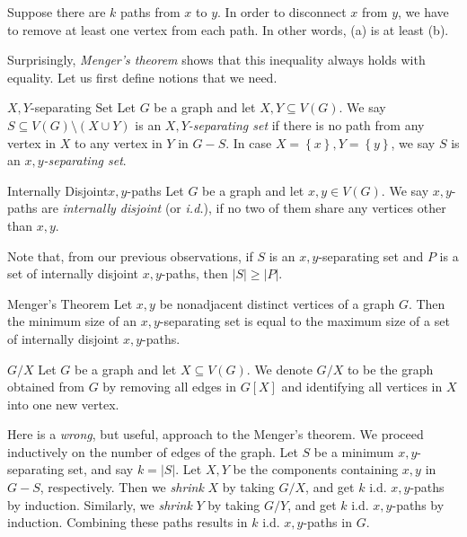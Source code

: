 \documentclass[co342]{subfiles}
\begin{document}
    \begin{subproof}
        Suppose there are $k$ paths from $x$ to $y$. In order to disconnect $x$ from $y$, we have to remove at least one vertex from each path. In other words, (a) is at least (b). 
    \end{subproof}
    
    \noindent Surprisingly, \textit{Menger's theorem} shows that this inequality always holds with equality. Let us first define notions that we need.
    
    \begin{definition}{$X,Y$-separating Set}{}
        Let $G$ be a graph and let $X,Y\subseteq V\left( G \right)$. We say $S\subseteq V\left( G \right)\setminus\left( X\cup Y \right)$ is an \emph{$X,Y$-separating set} if there is no path from any vertex in $X$ to any vertex in $Y$ in $G-S$. In case $X=\left\lbrace x \right\rbrace,Y=\left\lbrace y \right\rbrace$, we say $S$ is an \emph{$x,y$-separating set}.
    \end{definition}

    \begin{definition}{Internally Disjoint}{$x,y$-paths}
        Let $G$ be a graph and let $x,y\in V\left( G \right)$. We say $x,y$-paths are \emph{internally disjoint} (or \emph{i.d.}), if no two of them share any vertices other than $x,y$.
    \end{definition}

    \noindent Note that, from our previous observations, if $S$ is an $x,y$-separating set and $P$ is a set of internally disjoint $x,y$-paths, then $\left| S \right| \geq \left| P \right|$.

    \begin{theorem}{Menger's Theorem}
        Let $x,y$ be nonadjacent distinct vertices of a graph $G$. Then the minimum size of an $x,y$-separating set is equal to the maximum size of a set of internally disjoint $x,y$-paths.
    \end{theorem}

    \begin{notation}{$G /X$}{}
        Let $G$ be a graph and let $X\subseteq V\left( G \right)$. We denote $G /X$ to be the graph obtained from $G$ by removing all edges in $G\left[ X \right]$ and identifying all vertices in $X$ into one new vertex.
    \end{notation}

    Here is a \textit{wrong}, but useful, approach to the Menger's theorem. We proceed inductively on the number of edges of the graph. Let $S$ be a minimum $x,y$-separating set, and say $k=\left| S \right|$. Let $X,Y$ be the components containing $x,y$ in $G-S$, respectively. Then we \textit{shrink} $X$ by taking $G /X$, and get $k$ i.d. $x,y$-paths by induction. Similarly, we \textit{shrink} $Y$ by taking $G /Y$, and get $k$ i.d. $x,y$-paths by induction. Combining these paths results in $k$ i.d. $x,y$-paths in $G$.
\end{document}
